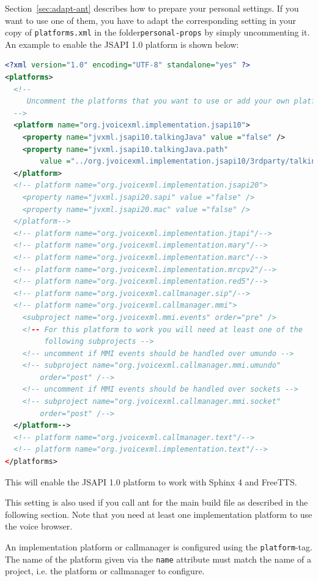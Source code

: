 \documentclass[11pt,a4paper]{article}
\begin{document}
Section~\ref{sec:adapt-ant} describes how to prepare your personal settings.
If you want to use one of them, you have to adapt the corresponding setting in
your copy of \texttt{platforms.xml} in the folder\texttt{personal-props} by
simply uncommenting it.
An example to enable the JSAPI 1.0 platform is shown below:
\begin{lstlisting}[language=XML]
<?xml version="1.0" encoding="UTF-8" standalone="yes" ?>
<platforms>
  <!--
     Uncomment the platforms that you want to use or add your own platform.
  -->
  <platform name="org.jvoicexml.implementation.jsapi10">
    <property name="jvxml.jsapi10.talkingJava" value ="false" />
    <property name="jvxml.jsapi10.talkingJava.path"
        value ="../org.jvoicexml.implementation.jsapi10/3rdparty/talkingjava/lib" />
  </platform>
  <!-- platform name="org.jvoicexml.implementation.jsapi20">
    <property name="jvxml.jsapi20.sapi" value ="false" />
    <property name="jvxml.jsapi20.mac" value ="false" />
  </platform-->
  <!-- platform name="org.jvoicexml.implementation.jtapi"/-->
  <!-- platform name="org.jvoicexml.implementation.mary"/-->
  <!-- platform name="org.jvoicexml.implementation.marc"/-->
  <!-- platform name="org.jvoicexml.implementation.mrcpv2"/-->
  <!-- platform name="org.jvoicexml.implementation.red5"/-->
  <!-- platform name="org.jvoicexml.callmanager.sip"/-->
  <!-- platform name="org.jvoicexml.callmanager.mmi">
    <subproject name="org.jvoicexml.mmi.events" order="pre" />
    <!-- For this platform to work you will need at least one of the
         following subprojects -->
    <!-- uncomment if MMI events should be handled over umundo -->
    <!-- subproject name="org.jvoicexml.callmanager.mmi.umundo"
        order="post" /-->
    <!-- uncomment if MMI events should be handled over sockets -->
    <!-- subproject name="org.jvoicexml.callmanager.mmi.socket"
        order="post" /-->
  </platform-->
  <!-- platform name="org.jvoicexml.callmanager.text"/-->
  <!-- platform name="org.jvoicexml.implementation.text"/-->
</platforms>
\end{lstlisting}

This will enable the JSAPI 1.0 platform to work with Sphinx 4 and FreeTTS. 

This setting is also used if you call ant for the main build file as described
in the following section.
Note that you need at least one implementation platform to use the voice
browser.

An implementation platform or callmanager is configured using the
\lstinline{platform}-tag. The name of the platform given via the
\lstinline{name} attribute must match the name of a project, i.e. the
platform or callmanager to configure.
\end{document}
